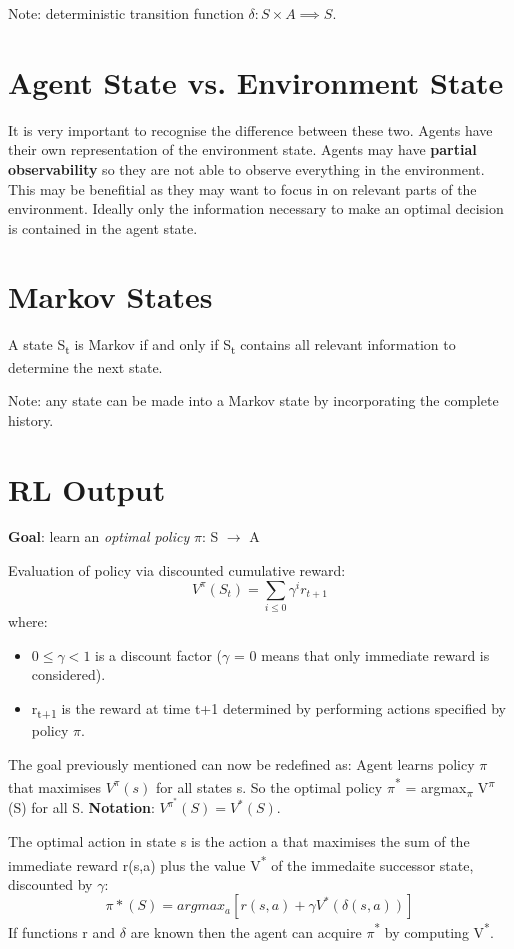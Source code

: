 \documentclass[11pt]{article}
\begin{document}
Note: deterministic transition function \(\delta: S \times A \implies S\).

\section{Agent State vs. Environment State}
\label{sec:org20a716c}
It is very important to recognise the difference between these two.
Agents have their own representation of the environment state.
Agents may have \textbf{partial observability} so they are not able to observe everything in the environment.
This may be benefitial as they may want to focus in on relevant parts of the environment.
Ideally only the information necessary to make an optimal decision is contained in the agent state.

\section{Markov States}
\label{sec:org17b8afe}
A state S\textsubscript{t} is Markov if and only if S\textsubscript{t} contains all relevant information to determine the next state.

Note: any state can be made into a Markov state by incorporating the complete history.

\section{RL Output}
\label{sec:org434f86b}
\textbf{Goal}: learn an \emph{optimal policy} \(\pi\): S \(\rightarrow\) A

Evaluation of policy via discounted cumulative reward:
\begin{equation}
V^{\pi}(S_t) = \sum\limits_{i \le 0} \gamma^i r_{t+1}
\end{equation}
where:
\begin{itemize}
\item \(0\le \gamma < 1\) is a discount factor (\(\gamma\) = 0 means that only immediate reward is considered).
\item r\textsubscript{t+1} is the reward at time t+1 determined by performing actions specified by policy \(\pi\).
\end{itemize}
The goal previously mentioned can now be redefined as: Agent learns policy \(\pi\) that maximises \(V^{\pi}(s)\) for all states s.
So the optimal policy \(\pi\)\textsuperscript{*} = argmax\textsubscript{\(\pi\)} V\textsuperscript{\(\pi\)}(S) for all S.
\textbf{Notation}: \(V^{\pi^*}(S) = V^*(S)\).

The optimal action in state s is the action a that maximises the sum of the immediate reward r(s,a) plus the value V\textsuperscript{*} of the immedaite successor state, discounted by \(\gamma\):
\begin{equation}
\pi*(S) = argmax_a[r(s,a) + \gamma V^*(\delta(s,a))]
\end{equation}
If functions r and \(\delta\) are known then the agent can acquire \(\pi\)\textsuperscript{*} by computing V\textsuperscript{*}.
\end{document}
